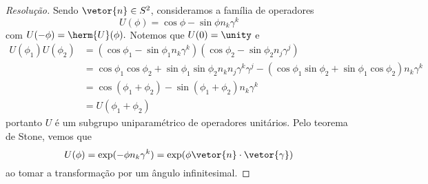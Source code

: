 \begin{proof}[Resolução]
    Sendo \(\vetor{n} \in S^2\), consideramos a família de operadores
    \begin{equation*}
        U(\phi) = \cos\phi - \sin\phi n_k \gamma^k
    \end{equation*}
    com \(U(-\phi) = \herm{U}(\phi).\) Notemos que \(U(0) = \unity\) e 
    \begin{align*}
        U(\phi_1)U(\phi_2) &= (\cos\phi_1 - \sin{\phi_1} n_k \gamma^k)(\cos\phi_2 - \sin{\phi_2} n_j\gamma^j)\\
                           &= \cos\phi_1 \cos\phi_2 + \sin\phi_1 \sin\phi_2 n_k n_j \gamma^k \gamma^j - (\cos\phi_1 \sin\phi_2 + \sin\phi_1 \cos\phi_2) n_k \gamma^k\\
                           &= \cos(\phi_1 + \phi_2) - \sin(\phi_1 + \phi_2) n_k \gamma^k\\
                           &= U(\phi_1 + \phi_2)
    \end{align*}
    portanto \(U\) é um subgrupo uniparamétrico de operadores unitários. Pelo teorema de Stone, vemos que
    \begin{equation*}
        U(\phi) = \exp(-\phi n_k \gamma^k) = \exp(\phi \vetor{n}\cdot\vetor{\gamma})
    \end{equation*}
    ao tomar a transformação por um ângulo infinitesimal.


\end{proof}
